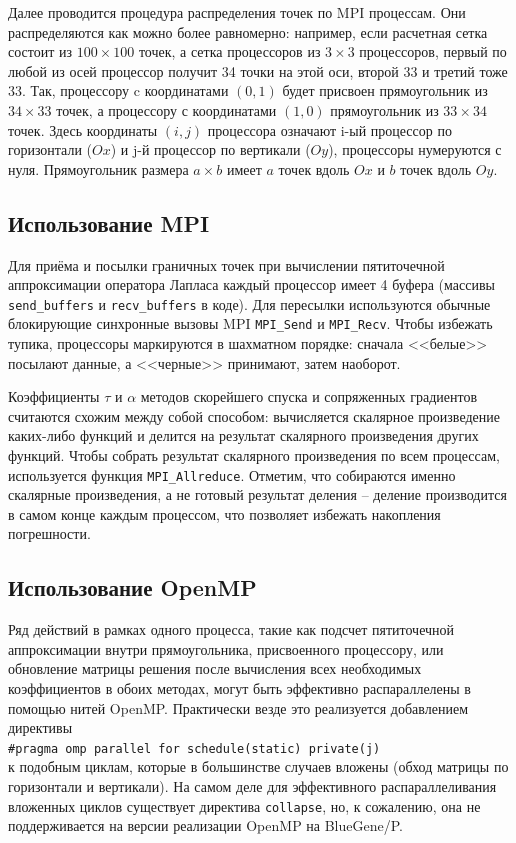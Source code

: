 \documentclass[12pt,notitlepage,oneside]{extarticle}
\begin{document}
Далее проводится процедура распределения точек по MPI процессам. Они
распределяются как можно более равномерно: например, если расчетная сетка
состоит из $100 \times 100$ точек, а сетка процессоров из $3 \times 3$
процессоров, первый по любой из осей процессор получит 34 точки на этой оси,
второй 33 и третий тоже 33. Так, процессору c координатами $(0, 1)$ будет
присвоен прямоугольник из $34 \times 33$ точек, а процессору с координатами
$(1, 0)$ прямоугольник из $33 \times 34$ точек. Здесь координаты $(i, j)$
процессора означают i-ый процессор по горизонтали ($Ox$) и j-й процессор
по вертикали ($Oy$), процессоры нумеруются с нуля. Прямоугольник размера
$a \times b$ имеет $a$ точек вдоль $Ox$ и $b$ точек вдоль $Oy$.

\subsection{Использование MPI}
Для приёма и посылки граничных точек при вычислении пятиточечной аппроксимации
оператора Лапласа каждый процессор имеет 4 буфера (массивы \texttt{send\_buffers}
и \texttt{recv\_buffers} в коде). Для пересылки используются обычные блокирующие
синхронные вызовы MPI \texttt{MPI\_Send} и \texttt{MPI\_Recv}. Чтобы избежать
тупика, процессоры маркируются в шахматном порядке: сначала <<белые>> посылают
данные, а <<черные>> принимают, затем наоборот.

Коэффициенты $\tau$ и $\alpha$ методов скорейшего спуска и сопряженных
градиентов считаются схожим между собой способом: вычисляется скалярное
произведение каких-либо функций и делится на результат скалярного произведения
других функций.  Чтобы собрать результат скалярного произведения по всем
процессам, используется функция \texttt{MPI\_Allreduce}. Отметим, что собираются
именно скалярные произведения, а не готовый результат деления -- деление
производится в самом конце каждым процессом, что позволяет избежать накопления
погрешности.

\subsection{Использование OpenMP}
Ряд действий в рамках одного процесса, такие как подсчет пятиточечной
аппроксимации внутри прямоугольника, присвоенного процессору, или обновление
матрицы решения после вычисления всех необходимых коэффициентов в обоих методах,
могут быть эффективно распараллелены в помощью нитей OpenMP.  Практически везде
это реализуется добавлением директивы \\
\texttt{\#pragma omp parallel for schedule(static) private(j)} \\
к подобным циклам, которые в большинстве случаев вложены (обход матрицы по
горизонтали и вертикали). На самом деле для эффективного распараллеливания
вложенных циклов существует директива \texttt{collapse}, но, к сожалению, она не
поддерживается на версии реализации OpenMP на BlueGene/P.
\end{document}
